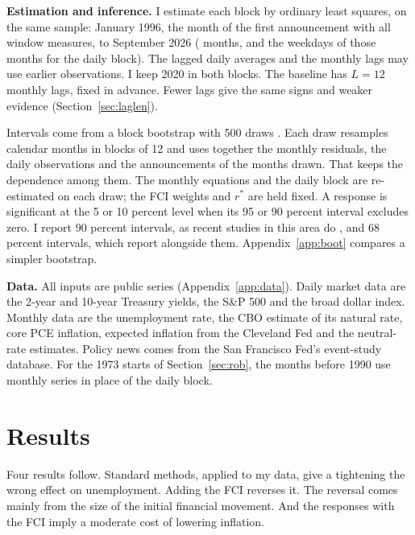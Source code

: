 \documentclass[11pt]{article}
\newcommand{\rs}{r^{*}}
\begin{document}
\textbf{Estimation and inference.} I estimate each block by ordinary least squares, on the same sample: January 1996, the month of the first announcement with all window measures, to September 2026 ( months, and the weekdays of those months for the daily block). The lagged daily averages and the monthly lags may use earlier observations. I keep 2020 in both blocks. The baseline has $L=12$ monthly lags, fixed in advance. Fewer lags give the same signs and weaker evidence (Section~\ref{sec:laglen}).

Intervals come from a block bootstrap with 500 draws \citep{kunsch1989,jentsch2019}. Each draw resamples calendar months in blocks of 12 and uses together the monthly residuals, the daily observations and the announcements of the months drawn. That keeps the dependence among them. The monthly equations and the daily block are re-estimated on each draw; the FCI weights and $\rs$ are held fixed. A response is significant at the 5 or 10 percent level when its 95 or 90 percent interval excludes zero. I report 90 percent intervals, as recent studies in this area do \citep{bauer2023,caldara2019,miranda2021,ramey2016}, and 68 percent intervals, which \citet{jarocinski2020} report alongside them. Appendix~\ref{app:boot} compares a simpler bootstrap.

\textbf{Data.} All inputs are public series (Appendix~\ref{app:data}). Daily market data are the 2-year and 10-year Treasury yields, the S\&P 500 and the broad dollar index. Monthly data are the unemployment rate, the CBO estimate of its natural rate, core PCE inflation, expected inflation from the Cleveland Fed and the neutral-rate estimates. Policy news comes from the San Francisco Fed's event-study database. For the 1973 starts of Section~\ref{sec:rob}, the months before 1990 use monthly series in place of the daily block.

\FloatBarrier
\section{Results}\label{sec:results}
Four results follow. Standard methods, applied to my data, give a tightening the wrong effect on unemployment. Adding the FCI reverses it. The reversal comes mainly from the size of the initial financial movement. And the responses with the FCI imply a moderate cost of lowering inflation.
\end{document}
